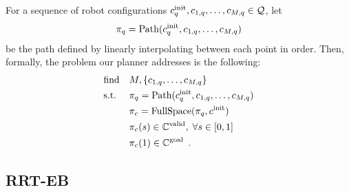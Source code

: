 For a sequence of robot configurations $c^\textrm{init}_q, c_{1,q}, \dots, c_{M,q} \in \mathcal{Q}$, let 
\begin{equation}
    \pi_{q} = \textrm{Path}(c^\textrm{init}_q, c_{1,q}, \dots, c_{M,q})
\end{equation}
be the path defined by linearly interpolating between each point in order. Then, formally, the problem our planner addresses is the following:
\begin{equation}
    \begin{aligned}
        & \text{find}   & & M, \{ c_{1,q}, \dots, c_{M,q} \} \\
        & \text{s.t.}   & & \pi_{q} = \textrm{Path}(c^\textrm{init}_q, c_{1,q}, \dots, c_{M,q}) \\
        &               & & \pi_{c} = \textrm{FullSpace}(\pi_{q}, c^\textrm{init}) \\
        &               & & \pi_{c}(s) \in \mathbb{C}^\textrm{valid}, \; \forall s \in [0, 1] \\
        &               & & \pi_{c}(1) \in \mathbb{C}^\textrm{goal} \enspace . \\
    \end{aligned}
    \label{eqn:planning_problemstatement}
\end{equation}


\subsection{RRT-EB}

